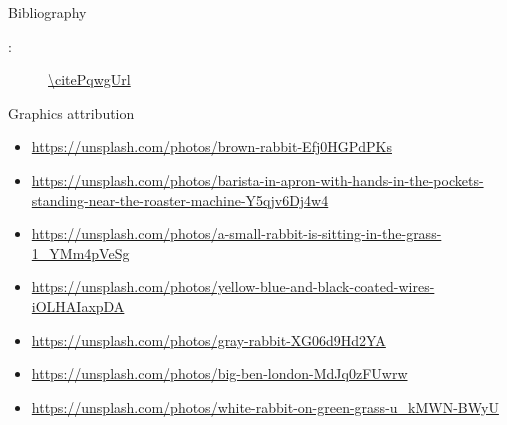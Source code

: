 
\begin{frame}{Bibliography}
  \begin{description}
    \item[\citePqwg:] \url{\citePqwgUrl}
  \end{description}
\end{frame}

\begin{frame}{Graphics attribution}
  \tiny
  \begin{itemize}
    \item \url{https://unsplash.com/photos/brown-rabbit-Efj0HGPdPKs}
    \item \url{https://unsplash.com/photos/barista-in-apron-with-hands-in-the-pockets-standing-near-the-roaster-machine-Y5qjv6Dj4w4}
    \item \url{https://unsplash.com/photos/a-small-rabbit-is-sitting-in-the-grass-1_YMm4pVeSg}
    \item \url{https://unsplash.com/photos/yellow-blue-and-black-coated-wires-iOLHAIaxpDA}
    \item \url{https://unsplash.com/photos/gray-rabbit-XG06d9Hd2YA}
    \item \url{https://unsplash.com/photos/big-ben-london-MdJq0zFUwrw}
    \item \url{https://unsplash.com/photos/white-rabbit-on-green-grass-u_kMWN-BWyU}
  \end{itemize}
\end{frame}
